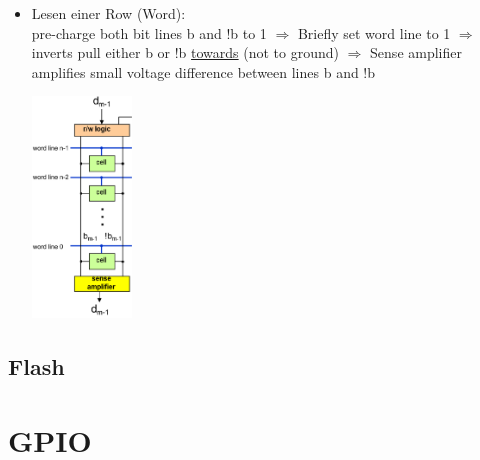 \documentclass{article}
\newenvironment{Figure}
	{\par\medskip\noindent\minipage{\linewidth}}
	{\endminipage\par\medskip}
\begin{document}
\begin{itemize}
{	}
	\item {Lesen einer Row (Word):\\
	pre-charge both bit lines b and !b to 1 $\Rightarrow$ Briefly set word line to 1 $\Rightarrow$ inverts pull either b or !b \underline{towards} (not to ground) $\Rightarrow$ Sense amplifier amplifies small voltage difference between lines b and !b
	\begin{Figure}
	\includegraphics[width=100px]{img/SchemaFuerRWRowSRAM.png}
	\label{fig:Schema RW Word SRAM}
	\end{Figure}		
	}
\end{itemize}

\subsection{Flash}

\section{GPIO}
\end{document}
